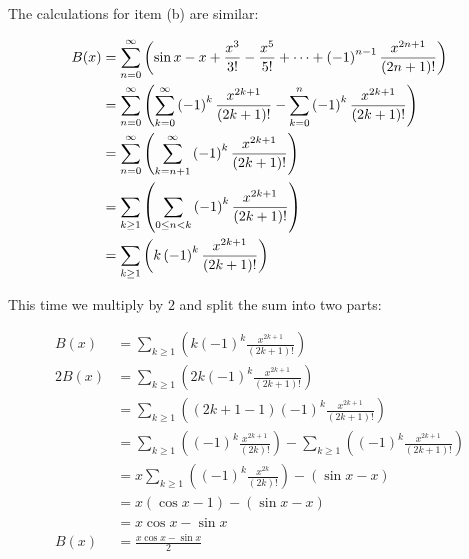 \documentclass{letter}
\begin{document}
\begin{letter}{}
  The calculations for item (b) are similar:

  \begin{align*}
  B(x) &= \sum_{n=0}^{\infty}\left(\sin x -x +\frac{x^{3}}{3!}-\frac{x^{5}}{5!}+\cdots+
    \left(-1\right)^{n-1}\frac{x^{2n+1}}{\left(2n+1\right)!}   \right) \\
       &= \sum_{n=0}^{\infty}\left(
    \sum_{k=0}^{\infty}\left(-1\right)^k \frac{x^{2k+1}}{(2k+1)!} 
    -\sum_{k=0}^{n}\left(-1\right)^k \frac{x^{2k+1}}{(2k+1)!} \right) \\
       &= \sum_{n=0}^{\infty}\left(
    \sum_{k=n+1}^{\infty}\left(-1\right)^k \frac{x^{2k+1}}{(2k+1)!} \right)\\
       &= \sum_{k\ge 1}\left(
    \sum_{0\le n < k}\left(-1\right)^k \frac{x^{2k+1}}{(2k+1)!} \right)\\
       &= \sum_{k\ge 1}\left(k
    \left(-1\right)^k \frac{x^{2k+1}}{(2k+1)!} \right)\\
  \end{align*}

  This time we multiply by $2$ and split the sum into two parts:
  
  \begin{align*}
    B(x) &= \sum_{k\ge 1}\left(k
    \left(-1\right)^k \frac{x^{2k+1}}{(2k+1)!} \right)\\
    2B(x) &= \sum_{k\ge 1}\left(2k
    \left(-1\right)^k \frac{x^{2k+1}}{(2k+1)!} \right)\\
    &= \sum_{k\ge 1}\left((2k+1-1)
    \left(-1\right)^k \frac{x^{2k+1}}{(2k+1)!} \right)\\
    &= \sum_{k\ge 1}\left(\left(-1\right)^k \frac{x^{2k+1}}{(2k)!} \right)
      - \sum_{k\ge 1}\left(\left(-1\right)^k \frac{x^{2k+1}}{(2k+1)!} \right) \\
    &= x\sum_{k\ge 1}\left(\left(-1\right)^k \frac{x^{2k}}{(2k)!} \right)
      - (\sin x - x) \\
    &= x(\cos x - 1) - (\sin x - x) \\
    &= x\cos x - \sin x \\
    B(x) &= \frac{x\cos x - \sin x}{2}
  \end{align*}

\end{letter}
\end{document}
